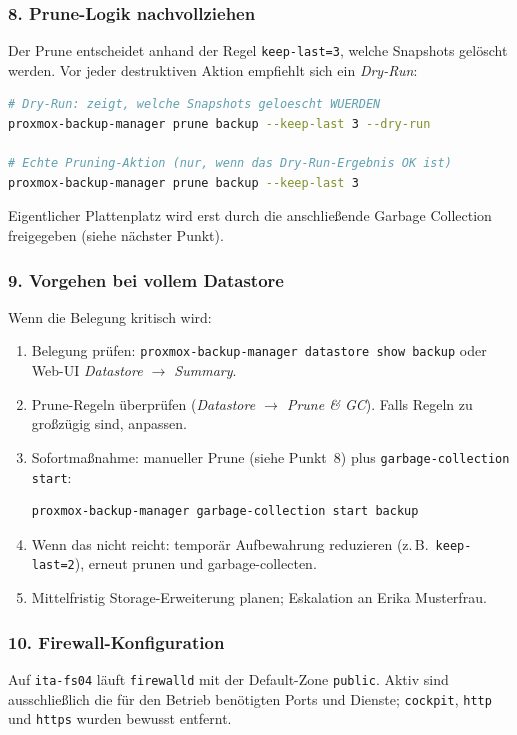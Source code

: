 \subsubsection*{8. Prune-Logik nachvollziehen}
Der Prune entscheidet anhand der Regel \texttt{keep-last=3}, welche
Snapshots gelöscht werden. Vor jeder destruktiven Aktion empfiehlt
sich ein \emph{Dry-Run}:
\begin{lstlisting}[language=bash,caption={Prune simulieren / ausfuehren}]
# Dry-Run: zeigt, welche Snapshots geloescht WUERDEN
proxmox-backup-manager prune backup --keep-last 3 --dry-run

# Echte Pruning-Aktion (nur, wenn das Dry-Run-Ergebnis OK ist)
proxmox-backup-manager prune backup --keep-last 3
\end{lstlisting}
Eigentlicher Plattenplatz wird erst durch die anschließende
Garbage Collection freigegeben (siehe nächster Punkt).

\subsubsection*{9. Vorgehen bei vollem Datastore}
Wenn die Belegung kritisch wird:
\begin{enumerate}\setlength{\itemsep}{1pt}
    \item Belegung prüfen:
          \texttt{proxmox-backup-manager datastore show backup}
          oder Web-UI \emph{Datastore $\to$ Summary}.
    \item Prune-Regeln überprüfen
          (\emph{Datastore $\to$ Prune \& GC}). Falls Regeln zu
          großzügig sind, anpassen.
    \item Sofortmaßnahme: manueller Prune (siehe Punkt~8) plus
          \texttt{garbage-collection start}:
\begin{lstlisting}[language=bash]
proxmox-backup-manager garbage-collection start backup
\end{lstlisting}
    \item Wenn das nicht reicht: temporär Aufbewahrung reduzieren
          (z.\,B.\ \texttt{keep-last=2}), erneut prunen und
          garbage-collecten.
    \item Mittelfristig Storage-Erweiterung planen; Eskalation an
          Erika Musterfrau.
\end{enumerate}

\subsubsection*{10. Firewall-Konfiguration}
Auf \texttt{ita-fs04} läuft \texttt{firewalld} mit der Default-Zone
\texttt{public}. Aktiv sind ausschließlich die für den Betrieb
benötigten Ports und Dienste; \texttt{cockpit}, \texttt{http} und
\texttt{https} wurden bewusst entfernt.

